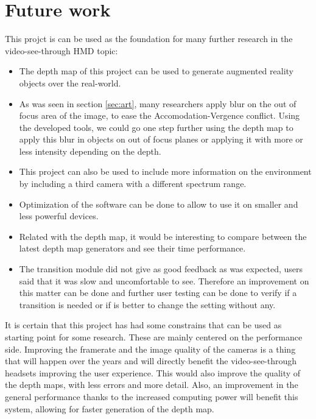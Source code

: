 \documentclass[10pt,a4paper,twocolumn,twoside]{article}
\begin{document}
	
	\section{Future work}
	This projct is can be used as the foundation for many further research in the video-see-through HMD topic: 
	
	\begin{itemize}
		\item The depth map of this project can be used to generate augmented reality objects over the real-world.
		
		\item As was seen in section \ref{sec:art}, many researchers apply blur on the out of focus area of the image, to ease the Accomodation-Vergence conflict. Using the developed tools, we could go one step further using the depth map to apply this blur in objects on out of focus planes or applying it with more or less intensity depending on the depth. 
		
		\item This project can also be used to include more information on the environment by including a third camera with a different spectrum range.  
		
		\item Optimization of the software can be done to allow to use it on smaller and less powerful devices. 
		
		\item Related with the depth map, it would be interesting to compare between the latest depth map generators and see their time performance. 
		
		\item The transition module did not give as good feedback as was expected, users said that it was slow and uncomfortable to see. Therefore an improvement on this matter can be done and further user testing can be done to verify if a transition is needed or if is better to change the setting without any.
	\end{itemize}

	It is certain that this project has had some constrains that can be used as starting point for some research. These are mainly centered on the performance side. Improving the framerate and the image quality of the cameras is a thing that will happen over the years and will directly benefit the video-see-through headsets improving the user experience.
	This would also improve the quality of the depth maps, with less errors and more detail. Also, an improvement in the general performance thanks to the increased computing power will benefit this system, allowing for faster generation of the depth map.  
	
\end{document}
